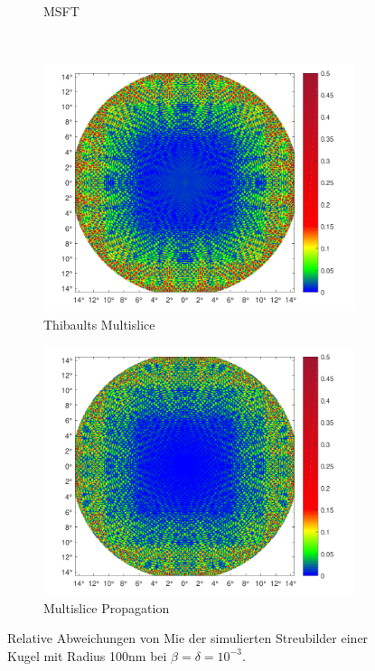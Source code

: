 \begin{figure}
\begin{subfigure}[b]{0.45\textwidth}
		\caption{MSFT}
	\end{subfigure}
	\\
	\begin{subfigure}[b]{0.45\textwidth}
		\includegraphics[width=\textwidth]{images/fig_sim_relerror_thibault-r100-bd1e-3.pdf}
		\caption{Thibaults Multislice}
	\end{subfigure}
	\begin{subfigure}[b]{0.45\textwidth}
		\includegraphics[width=\textwidth]{images/fig_sim_relerror_multislice-r100-bd1e-3.pdf}
		\caption{Multislice Propagation}
	\end{subfigure}
	
	\caption[relativer Fehler der Simulationen]{Relative Abweichungen von Mie der simulierten Streubilder einer Kugel mit Radius 100\si{nm} bei $\beta=\delta=10^{-3}$. }
	\label{fig:relerror}
\end{figure}

